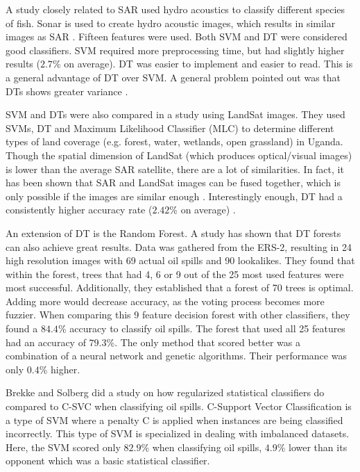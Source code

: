 A study closely related to SAR used hydro acoustics to classify different species of fish. Sonar is used to create hydro acoustic images, which results in similar images as SAR \cite{griffiths2003synthetic}. Fifteen features were used. Both SVM and DT were considered good classifiers. SVM required more preprocessing time, but had slightly higher results ($2.7$\% on average). DT was easier to implement and easier to read. This is a general advantage of DT over SVM. A general problem pointed out was that DTs shows greater variance \cite{Robotham2011170}.

SVM and DTs were also compared in a study using LandSat images. They used SVMs, DT and Maximum Likelihood Classifier (MLC) to determine different types of land coverage (e.g. forest, water, wetlands, open grassland) in Uganda. Though the spatial dimension of LandSat (which produces optical/visual images) is lower than the average SAR satellite, there are a lot of similarities. In fact, it has been shown that SAR and LandSat images can be fused together, which is only possible if the images are similar enough \cite{dupas2000sar}. Interestingly enough, DT had a consistently higher accuracy rate ($2.42$\% on average) \cite{Otukei2010S27}.

An extension of DT is the Random Forest. A study \cite{Topouzelis201268} has shown that DT forests can also achieve great results. Data was gathered from the ERS-2, resulting in 24 high resolution images with 69 actual oil spills and 90 lookalikes. They found that within the forest, trees that had 4, 6 or 9 out of the 25 most used features were most successful. Additionally, they established that a forest of 70 trees is optimal. Adding more would decrease accuracy, as the voting process becomes more fuzzier. When comparing this 9 feature decision forest with other classifiers, they found a $84.4$\% accuracy to classify oil spills. The forest that used all 25 features had an accuracy of $79.3$\%. The only method that scored better was a combination of a neural network and genetic algorithms. Their performance was only $0.4$\% higher.

Brekke and Solberg \cite{brekke2008classifiers} did a study on how regularized statistical classifiers do compared to C-SVC when classifying oil spills. C-Support Vector Classification is a type of SVM where a penalty C is applied when instances are being classified incorrectly. This type of SVM is specialized in dealing with imbalanced datasets. Here, the SVM scored only $82.9$\% when classifying oil spills, $4.9$\% lower than its opponent which was a basic statistical classifier. 

